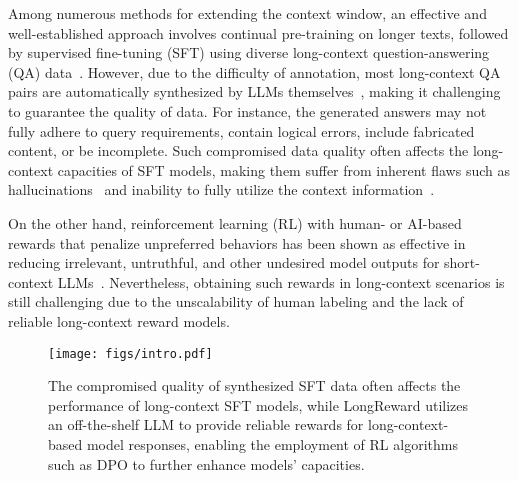 Among numerous methods for extending the context window, an effective and well-established approach involves continual pre-training on longer texts, followed by supervised fine-tuning (SFT) using diverse long-context question-answering (QA) data~\cite{longllama, longalign}.  However, due to the difficulty of annotation, most long-context QA pairs are automatically synthesized by LLMs themselves~\cite{longalign, llama-3-1, An2024}, making it challenging to guarantee the quality of data. For instance, the generated answers may not fully adhere to query requirements,  contain logical errors, include fabricated content, or be incomplete. Such compromised data quality often affects the long-context capacities of SFT models, making them suffer from inherent flaws such as hallucinations~\cite{huang23} and inability to fully utilize the context information~\cite{lostinmiddle, longcite}.

On the other hand, reinforcement learning (RL) with human- or AI-based rewards that penalize unpreferred behaviors has been shown as effective in reducing irrelevant, untruthful, and other undesired model outputs for short-context LLMs~\cite{rlhf, rlaif, tian2024}. Nevertheless, obtaining such rewards in long-context scenarios is still challenging due to the unscalability of human labeling and the lack of reliable long-context reward models. 

\begin{figure*}
    \centering
    \texttt{[image: figs/intro.pdf]}
    \caption{The compromised quality of synthesized SFT data often affects the performance of long-context SFT models, while LongReward utilizes an off-the-shelf LLM to provide reliable rewards for long-context-based model responses, enabling the employment of RL algorithms such as DPO to further enhance models' capacities.}
    \label{fig:intro}
\end{figure*}

